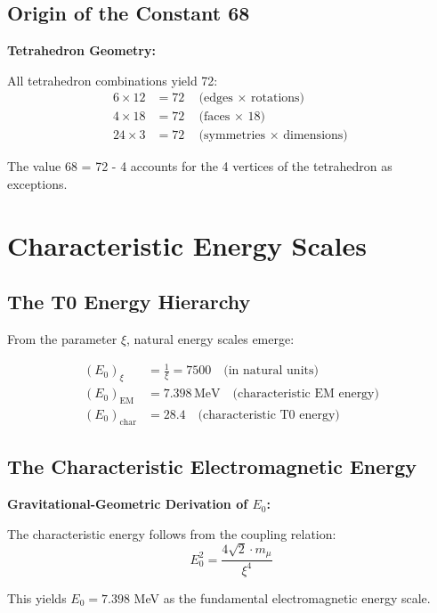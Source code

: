 	\subsection{Origin of the Constant 68}
	
	\begin{alternative}
		\textbf{Tetrahedron Geometry:}
		
		All tetrahedron combinations yield 72:
		\begin{align}
			6 \times 12 &= 72 \quad \text{(edges $\times$ rotations)} \\
			4 \times 18 &= 72 \quad \text{(faces $\times$ 18)} \\
			24 \times 3 &= 72 \quad \text{(symmetries $\times$ dimensions)}
		\end{align}
		
		The value 68 = 72 - 4 accounts for the 4 vertices of the tetrahedron as exceptions.
	\end{alternative}
	
	\section{Characteristic Energy Scales}
	
	\subsection{The T0 Energy Hierarchy}
	
	From the parameter $\xi$, natural energy scales emerge:
	
	\begin{align}
		(E_0)_{\xi} &= \frac{1}{\xi} = 7500 \quad \text{(in natural units)} \\
		(E_0)_{\text{EM}} &= 7.398\,\mathrm{MeV} \quad \text{(characteristic EM energy)} \\
		(E_0)_{\text{char}} &= 28.4 \quad \text{(characteristic T0 energy)}
	\end{align}
	
	\subsection{The Characteristic Electromagnetic Energy}
	
	\begin{keyresult}
		\textbf{Gravitational-Geometric Derivation of $E_0$:}
		
		The characteristic energy follows from the coupling relation:
		\begin{equation}
			E_0^2 = \frac{4\sqrt{2} \cdot m_\mu}{\xi^4}
		\end{equation}
		
		This yields $E_0 = 7.398$ MeV as the fundamental electromagnetic energy scale.
	\end{keyresult}
	

